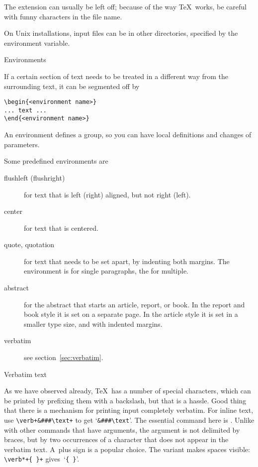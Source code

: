 The  extension can usually be left off; because of the way
\TeX\ works, be careful with funny characters in the file name.

On Unix installations, input files can be in other directories,
specified by the  environment variable.

 {Environments}
\label{sec:environment}

If a certain section of text needs to be treated in a different way
from the surrounding text, it can be segmented off by
\begin{verbatim}
\begin{<environment name>}
... text ...
\end{<environment name>}
\end{verbatim}
An environment defines a group, so you can have local definitions and 
changes of parameters.

Some predefined environments are
\begin{description}
\item[flushleft (flushright)]
  for text
  that is left (right) aligned, but not right (left).
\item[center] for text that is centered.
\item[quote, quotation]
  for text that
  needs to be set apart, by indenting both margins. The 
  environment is for single paragraphs, the  for multiple.
\item[abstract] for the abstract that
  starts an article, report, or book. In the report and book style it
  is set on a separate page. In the article style it is set in a
  smaller type size, and with indented margins.
\item[verbatim] see section~\ref{sec:verbatim}.
\end{description}

 {Verbatim text}
\label{sec:verbatim}

As we have observed already, \TeX\ has a number of special characters,
which can be printed by prefixing them with a backslash, but that is a
hassle. Good thing that there is a mechanism for printing input
completely verbatim. For inline text, use
\verb.\verb+&###\text+. to get `\verb+&###\text+'. The
essential command here is . Unlike with other commands
that have arguments, the argument is not delimited by braces, but by
two occurrences of a character that does not appear in the verbatim
text. A~plus sign is a popular choice. The  variant
makes spaces visible: \verb.\verb*+{ }+. gives~`\verb*+{ }+'.


